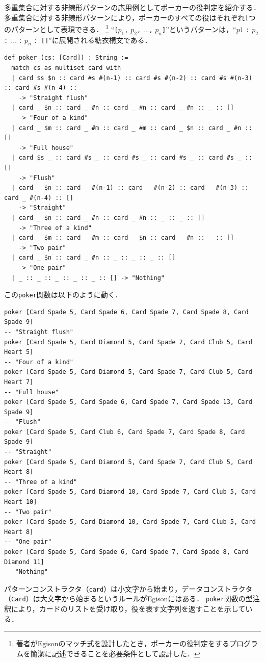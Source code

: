 多重集合に対する非線形パターンの応用例としてポーカーの役判定を紹介する．
多重集合に対する非線形パターンにより，ポーカーのすべての役はそれぞれ1つのパターンとして表現できる．
\footnote{著者がEgisonのマッチ式を設計したとき，ポーカーの役判定をするプログラムを簡潔に記述できることを必要条件として設計した．}
``\lstinline{[}$p_1$\lstinline{,} $p_2$\lstinline{,} $...$\lstinline{,} $p_n$\lstinline{]}''というパターンは，``$p1$ \lstinline{:} $p_2$ \lstinline{:} $...$ \lstinline{:} $p_n$ \lstinline{: []}''に展開される糖衣構文である．
\begin{lstlisting}[language=egison,numbers=none]
def poker (cs: [Card]) : String :=
  match cs as multiset card with
  | card $s $n :: card #s #(n-1) :: card #s #(n-2) :: card #s #(n-3) :: card #s #(n-4) :: _
    -> "Straight flush"
  | card _ $n :: card _ #n :: card _ #n :: card _ #n :: _ :: []
    -> "Four of a kind"
  | card _ $m :: card _ #m :: card _ #m :: card _ $n :: card _ #n :: []
    -> "Full house"
  | card $s _ :: card #s _ :: card #s _ :: card #s _ :: card #s _ :: []
    -> "Flush"
  | card _ $n :: card _ #(n-1) :: card _ #(n-2) :: card _ #(n-3) :: card _ #(n-4) :: []
    -> "Straight"
  | card _ $n :: card _ #n :: card _ #n :: _ :: _ :: []
    -> "Three of a kind"
  | card _ $m :: card _ #m :: card _ $n :: card _ #n :: _ :: []
    -> "Two pair"
  | card _ $n :: card _ #n :: _ :: _ :: _ :: []
    -> "One pair"
  | _ :: _ :: _ :: _ :: _ :: [] -> "Nothing"
\end{lstlisting}
この\lstinline{poker}関数は以下のように動く．
\begin{lstlisting}[language=egison,numbers=none]
poker [Card Spade 5, Card Spade 6, Card Spade 7, Card Spade 8, Card Spade 9]
-- "Straight flush"
poker [Card Spade 5, Card Diamond 5, Card Spade 7, Card Club 5, Card Heart 5]
-- "Four of a kind"
poker [Card Spade 5, Card Diamond 5, Card Spade 7, Card Club 5, Card Heart 7]
-- "Full house"
poker [Card Spade 5, Card Spade 6, Card Spade 7, Card Spade 13, Card Spade 9]
-- "Flush"
poker [Card Spade 5, Card Club 6, Card Spade 7, Card Spade 8, Card Spade 9]
-- "Straight"
poker [Card Spade 5, Card Diamond 5, Card Spade 7, Card Club 5, Card Heart 8]
-- "Three of a kind"
poker [Card Spade 5, Card Diamond 10, Card Spade 7, Card Club 5, Card Heart 10]
-- "Two pair"
poker [Card Spade 5, Card Diamond 10, Card Spade 7, Card Club 5, Card Heart 8]
-- "One pair"
poker [Card Spade 5, Card Spade 6, Card Spade 7, Card Spade 8, Card Diamond 11]
-- "Nothing"
\end{lstlisting}
パターンコンストラクタ（\lstinline{card}）は小文字から始まり，データコンストラクタ（\lstinline{Card}）は大文字から始まるというルールがEgisonにはある．
\lstinline{poker}関数の型注釈により，カードのリストを受け取り，役を表す文字列を返すことを示している．

